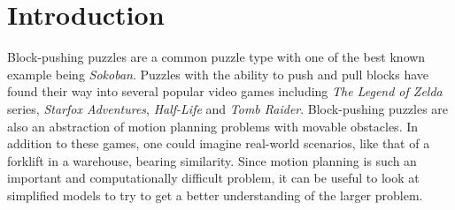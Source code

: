 
\section{Introduction} 
Block-pushing puzzles are a common puzzle type with one of the best known example being \emph{Sokoban}. Puzzles with the ability to push and pull blocks have found their way into several popular video games including \emph{The Legend of Zelda} series, \emph{Starfox Adventures}, \emph{Half-Life} and \emph{Tomb Raider}. Block-pushing puzzles are also an abstraction of motion planning problems with movable obstacles. In addition to these games, one could imagine real-world scenarios, like that of a forklift in a warehouse, bearing similarity. Since motion planning is such an important and computationally difficult problem, it can be useful to look at simplified models to try to get a better understanding of the larger problem.



